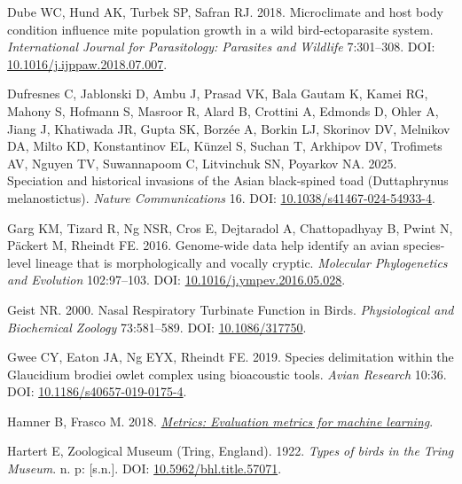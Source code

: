 \documentclass[10pt,a4paper]{article}
\newlength{\cslhangindent}
\newenvironment{CSLReferences}[2] %
 {\begin{list}{}{%
  \setlength{\itemindent}{0pt}
  \setlength{\leftmargin}{0pt}
  \setlength{\parsep}{0pt}
  \ifodd #1
   \setlength{\leftmargin}{\cslhangindent}
   \setlength{\itemindent}{-1\cslhangindent}
  \fi
  \setlength{\itemsep}{#2\baselineskip}}}
 {\end{list}}
\begin{document}
\begin{CSLReferences}{1}{0}
Dube WC, Hund AK, Turbek SP, Safran RJ. 2018. Microclimate and host body condition influence mite population growth in a wild bird-ectoparasite system. \emph{International Journal for Parasitology: Parasites and Wildlife} 7:301--308. DOI: \href{https://doi.org/10.1016/j.ijppaw.2018.07.007}{10.1016/j.ijppaw.2018.07.007}.

Dufresnes C, Jablonski D, Ambu J, Prasad VK, Bala Gautam K, Kamei RG, Mahony S, Hofmann S, Masroor R, Alard B, Crottini A, Edmonds D, Ohler A, Jiang J, Khatiwada JR, Gupta SK, Borzée A, Borkin LJ, Skorinov DV, Melnikov DA, Milto KD, Konstantinov EL, Künzel S, Suchan T, Arkhipov DV, Trofimets AV, Nguyen TV, Suwannapoom C, Litvinchuk SN, Poyarkov NA. 2025. Speciation and historical invasions of the {Asian} black-spined toad ({Duttaphrynus} melanostictus). \emph{Nature Communications} 16. DOI: \href{https://doi.org/10.1038/s41467-024-54933-4}{10.1038/s41467-024-54933-4}.

Garg KM, Tizard R, Ng NSR, Cros E, Dejtaradol A, Chattopadhyay B, Pwint N, Päckert M, Rheindt FE. 2016. Genome-wide data help identify an avian species-level lineage that is morphologically and vocally cryptic. \emph{Molecular Phylogenetics and Evolution} 102:97--103. DOI: \href{https://doi.org/10.1016/j.ympev.2016.05.028}{10.1016/j.ympev.2016.05.028}.

Geist NR. 2000. Nasal {Respiratory} {Turbinate} {Function} in {Birds}. \emph{Physiological and Biochemical Zoology} 73:581--589. DOI: \href{https://doi.org/10.1086/317750}{10.1086/317750}.

Gwee CY, Eaton JA, Ng EYX, Rheindt FE. 2019. Species delimitation within the {Glaucidium} brodiei owlet complex using bioacoustic tools. \emph{Avian Research} 10:36. DOI: \href{https://doi.org/10.1186/s40657-019-0175-4}{10.1186/s40657-019-0175-4}.

Hamner B, Frasco M. 2018. \emph{\href{https://CRAN.R-project.org/package=Metrics}{{Metrics}: Evaluation metrics for machine learning}}.

Hartert E, Zoological Museum (Tring, England). 1922. \emph{Types of birds in the {Tring} {Museum}}. n. p: {[}s.n.{]}. DOI: \href{https://doi.org/10.5962/bhl.title.57071}{10.5962/bhl.title.57071}.


\end{CSLReferences}
\end{document}
